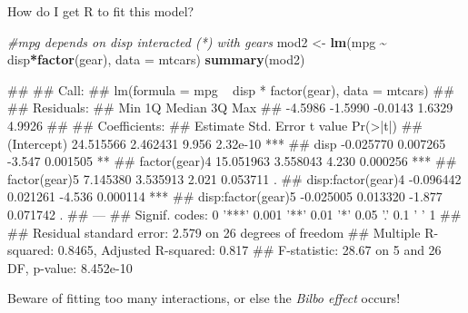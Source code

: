 \documentclass[
  ignorenonframetext,
  aspectratio=169]{beamer}
\newenvironment{Shaded}{\begin{snugshade}}{\end{snugshade}}
\newcommand{\AttributeTok}[1]{\textcolor[rgb]{0.13,0.29,0.53}{#1}}
\newcommand{\CommentTok}[1]{\textcolor[rgb]{0.56,0.35,0.01}{\textit{#1}}}
\newcommand{\FunctionTok}[1]{\textcolor[rgb]{0.13,0.29,0.53}{\textbf{#1}}}
\newcommand{\NormalTok}[1]{#1}
\newcommand{\OtherTok}[1]{\textcolor[rgb]{0.56,0.35,0.01}{#1}}
\newcommand{\SpecialCharTok}[1]{\textcolor[rgb]{0.81,0.36,0.00}{\textbf{#1}}}
\let\oldShaded\Shaded %
\let\endoldShaded\endShaded
\renewenvironment{Shaded}{\scriptsize\oldShaded}{\endoldShaded}
\let\oldverbatim\verbatim %
\let\endoldverbatim\endverbatim
\renewenvironment{verbatim}{\tiny\oldverbatim}{\endoldverbatim}
\begin{document}
\begin{frame}[fragile]{How do I get R to fit this model?}
\protect\hypertarget{how-do-i-get-r-to-fit-this-model-4}{}
\tiny

\begin{Shaded}
\begin{Highlighting}[]
\CommentTok{\#mpg depends on disp interacted (*) with gears}
\NormalTok{mod2 }\OtherTok{\textless{}{-}} \FunctionTok{lm}\NormalTok{(mpg }\SpecialCharTok{\textasciitilde{}}\NormalTok{ disp}\SpecialCharTok{*}\FunctionTok{factor}\NormalTok{(gear), }\AttributeTok{data =}\NormalTok{ mtcars) }
\FunctionTok{summary}\NormalTok{(mod2)}
\end{Highlighting}
\end{Shaded}

\begin{verbatim}
## 
## Call:
## lm(formula = mpg ~ disp * factor(gear), data = mtcars)
## 
## Residuals:
##     Min      1Q  Median      3Q     Max 
## -4.5986 -1.5990 -0.0143  1.6329  4.9926 
## 
## Coefficients:
##                     Estimate Std. Error t value Pr(>|t|)    
## (Intercept)        24.515566   2.462431   9.956 2.32e-10 ***
## disp               -0.025770   0.007265  -3.547 0.001505 ** 
## factor(gear)4      15.051963   3.558043   4.230 0.000256 ***
## factor(gear)5       7.145380   3.535913   2.021 0.053711 .  
## disp:factor(gear)4 -0.096442   0.021261  -4.536 0.000114 ***
## disp:factor(gear)5 -0.025005   0.013320  -1.877 0.071742 .  
## ---
## Signif. codes:  0 '***' 0.001 '**' 0.01 '*' 0.05 '.' 0.1 ' ' 1
## 
## Residual standard error: 2.579 on 26 degrees of freedom
## Multiple R-squared:  0.8465, Adjusted R-squared:  0.817 
## F-statistic: 28.67 on 5 and 26 DF,  p-value: 8.452e-10
\end{verbatim}

\small

Beware of fitting too many interactions, or else the \emph{Bilbo effect}
occurs!
\end{frame}
\end{document}
